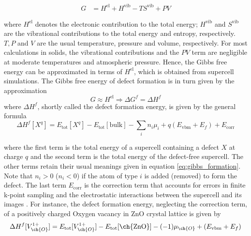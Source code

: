 \begin{align}
	G & = H^{\text{el}} + H^{\text{vib}} - TS^{\text{vib}} + PV
\end{align}

where $H^{\text{el}}$ denotes the electronic contribution to the total energy; $H^{\text{vib}}$ and $S^{\text{vib}}$  are the vibrational contributions to the total energy and entropy, respectively. $T,P$ and $V$ are the usual temperature, pressure and volume, respectively. For most calculations in solids, the vibrational contributions and the $PV$ term are negligible at moderate temperatures and atmospheric pressure. Hence, the Gibbs free energy can be approximated in terms of   $H^{\text{el}}$, which is obtained from supercell simulations.  The Gibbs free energy of defect formation is in turn given by the approximation
\begin{equation}
	G \approx H^{\text{el}} \Longrightarrow \Delta G^f = \Delta H^f
\end{equation}
where $\Delta H^f$, shortly called the defect formation energy, is given by the general formula \citep{Freysoldt2014}
\begin{equation} \label{eq:formation_E}
	\Delta H^f [X^q] = E_{\text{tot}}[X^q] - E_{\text{tot}}[\text{bulk}] -  \sum_i n_i \mu_i + q (E_{\text{vbm}} + E_f) + E_{\text{corr}}
\end{equation}

where the first  term is  the total energy  of a supercell containing a defect $X$ at charge $q$ and the  second term is the total energy of the defect-free supercell. The other terms retain their usual meanings given in equation \eqref{eq:gibbs_formation}. Note that $n_i > 0$ ($n_i < 0$) if the atom of type $i$ is added (removed) to form the defect. The last term $E_{\text{corr}}$ is the correction term that accounts for errors in finite k-point sampling and the electrostatic interactions between the supercell and its images \citep{Leslie1985,Makov1995,Dabo2008}. For instance, the defect formation energy, neglecting the correction term, of a positively charged Oxygen vacancy in ZnO crystal lattice is given by
\begin{equation}
	\Delta H^f [V^{1+}_{\ch{O}}] = E_{\text{tot}}[V^{1+}_{\ch{O}}] - E_{\text{tot}}[\text{\ch{ZnO}}] - (-1) \mu_{\ch{O}} + (E_{\text{vbm}} + E_f)
\end{equation}

